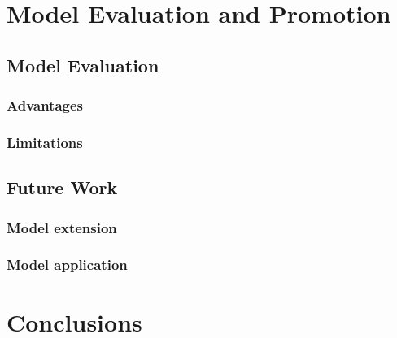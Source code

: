 \section{Model Evaluation and Promotion}
\subsection{Model Evaluation}

\subsubsection{Advantages}





\subsubsection{Limitations}



\subsection{Future Work}

\subsubsection{Model extension}


\subsubsection{Model application}










\section{Conclusions}














